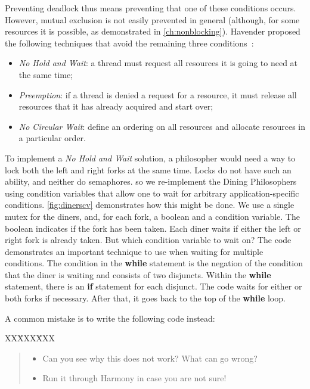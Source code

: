 \documentclass{report}
\newcommand{\harmonysource}[1]{
\begin{tabbing}
XX\=XXX\=XXX\kill
    
\end{tabbing}
}
\newenvironment{code}{
\tcolorbox
}{
\endtcolorbox
}
\begin{document}
Preventing deadlock thus means preventing that one of these conditions occurs.
However, mutual exclusion is not easily prevented in general
(although, for some resources it is
possible, as demonstrated in \autoref{ch:nonblocking}).
Havender proposed the following techniques that avoid the remaining
three conditions~\cite{Havender68}:

\begin{itemize}
\item \emph{No Hold and Wait}: a thread must request all resources it is going to
need at the same time;
\item \emph{Preemption}: if a thread is denied a request for a resource, it must
release all resources that it has already acquired and start over;
\item \emph{No Circular Wait}: define an ordering on all resources and allocate
resources in a particular order.
\end{itemize}

To implement a \emph{No Hold and Wait} solution, a philosopher would need a
way to lock both the left and right forks at the same time.  Locks do not
have such an ability, and neither do semaphores. so we re-implement the
Dining Philosophers using condition variables that allow one to wait for
arbitrary application-specific conditions.
%
\autoref{fig:dinerscv} demonstrates how this might be done.
We use a single mutex for the diners, and, for each fork, a boolean
and a condition variable.  The boolean indicates if the fork has been
taken.
Each diner waits if either the left or right fork is already taken.
But which condition variable to wait on?
The code demonstrates an important technique to use when waiting for
multiple conditions.
%
The condition in the \textbf{while} statement is the negation of the
condition that the diner is waiting and consists of two disjuncts.
Within the \textbf{while} statement,
there is an \textbf{if} statement for each disjunct.
The code waits for either or both forks if necessary.  After that, it goes
back to the top of the \textbf{while} loop.

A common mistake is to write the following code instead:

\begin{code}
\harmonysource{baddblwait}
\end{code}

\begin{quote}
\begin{itemize}
\item Can you see why this does not work?  What can go wrong?
\item Run it through Harmony in case you are not sure!
\end{itemize}
\end{quote}
\end{document}
